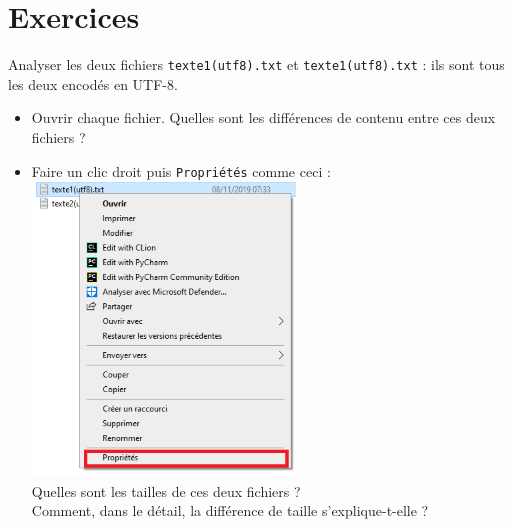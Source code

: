 \section{Exercices}
\begin{exercice}
    Analyser les deux fichiers \texttt{texte1(utf8).txt} et \texttt{texte1(utf8).txt} : ils sont tous les deux encodés en UTF-8.


    \begin{itemize}
        \item Ouvrir chaque fichier. Quelles sont les différences de contenu entre ces deux fichiers ?
        \item Faire un clic droit puis \texttt{Propriétés} comme ceci :\\

              \includegraphics[width=7cm]{img/expli1}\\

              Quelles sont les tailles de ces deux fichiers ?\\
              Comment, dans le détail, la différence de taille s'explique-t-elle ?

    \end{itemize}
\end{exercice}

